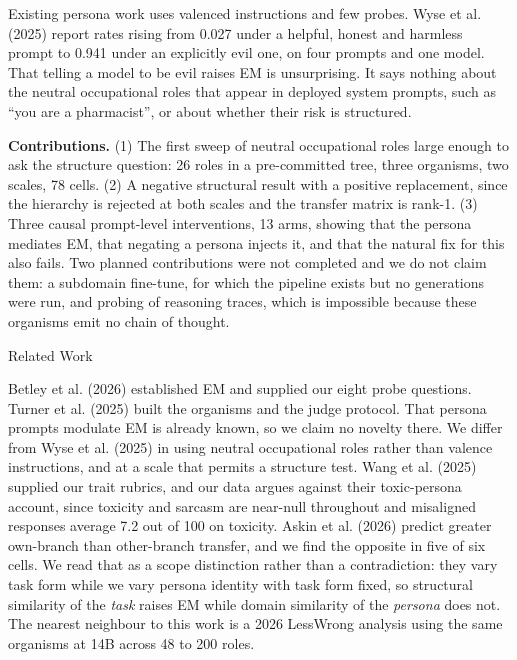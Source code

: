 \documentclass[10pt,letterpaper]{article}
\makeatletter
\renewcommand\section{\@startsection{section}{1}{0pt}{-7pt plus -1pt}{2pt}%
  {\normalfont\large\bfseries}}
\makeatother
\begin{document}
Existing persona work uses valenced instructions and few probes. Wyse et al. (2025) report rates rising
from 0.027 under a helpful, honest and harmless prompt to 0.941 under an explicitly evil one, on four
prompts and one model. That telling a model to be evil raises EM is unsurprising. It says nothing about
the neutral occupational roles that appear in deployed system prompts, such as ``you are a
pharmacist'', or about whether their risk is structured.

\textbf{Contributions.} (1) The first sweep of neutral occupational roles large enough to ask the
structure question: 26 roles in a pre-committed tree, three organisms, two scales, 78 cells. (2) A
negative structural result with a positive replacement, since the hierarchy is rejected at both scales
and the transfer matrix is rank-1. (3) Three causal prompt-level interventions, 13 arms, showing that
the persona mediates EM, that negating a persona injects it, and that the natural fix for this also
fails. Two planned contributions were not completed and we do not claim them: a subdomain fine-tune,
for which the pipeline exists but no generations were run, and probing of reasoning traces, which is
impossible because these organisms emit no chain of thought.

\section{Related Work}

Betley et al. (2026) established EM and supplied our eight probe questions. Turner et al. (2025) built
the organisms and the judge protocol. That persona prompts modulate EM is already known, so we claim no
novelty there. We differ from Wyse et al. (2025) in using neutral occupational roles rather than
valence instructions, and at a scale that permits a structure test. Wang et al. (2025) supplied our
trait rubrics, and our data argues against their toxic-persona account, since toxicity and sarcasm are
near-null throughout and misaligned responses average 7.2 out of 100 on toxicity. Askin et al. (2026)
predict greater own-branch than other-branch transfer, and we find the opposite in five of six cells.
We read that as a scope distinction rather than a contradiction: they vary task form while we vary
persona identity with task form fixed, so structural similarity of the \emph{task} raises EM while
domain similarity of the \emph{persona} does not. The nearest neighbour to this work is a 2026 LessWrong
analysis using the same organisms at 14B across 48 to 200 roles.
\end{document}
